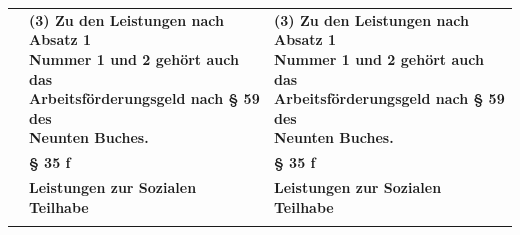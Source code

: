 \documentclass[10pt,a4paper,landscape]{article}
\begin{document}
\begin{longtable}{|L{8.2cm}|L{8.2cm}|L{8.2cm}|}
\hhline{|---|}
 & \textbf{(3) Zu den Leistungen nach Absatz 1  \newline Nummer 1 und 2 gehört auch das  \newline Arbeitsförderungsgeld nach \S{} 59 des  \newline Neunten Buches. } & \textbf{(3) Zu den Leistungen nach Absatz 1  \newline Nummer 1 und 2 gehört auch das  \newline Arbeitsförderungsgeld nach \S{} 59 des  \newline Neunten Buches. } \\
\hhline{|---|}
 & \textbf{\S{} 35 f } & \textbf{\S{} 35 f } \\
\hhline{|---|}
 & \textbf{Leistungen zur Sozialen Teilhabe} & \textbf{Leistungen zur Sozialen Teilhabe} \\
\hhline{|---|}

\end{longtable}
\end{document}
